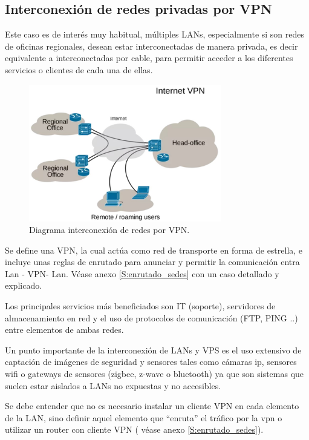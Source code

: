 \subsection{ Interconexión de redes privadas por VPN}
Este caso es de interés muy habitual, múltiples LANs, especialmente si son redes de oficinas regionales, desean estar interconectadas de manera privada, es decir equivalente a interconectadas por cable, para permitir acceder a los diferentes servicios o clientes de cada una de ellas.
\begin{figure}[!htb]
\begin{center}
\includegraphics[width=0.75\textwidth]{./figuras/vpn_network_link}
\caption{Diagrama interconexión de redes por VPN\cite{i_redes_sedes}.}
\label{F:vpn_network_link}
\end{center}
\end{figure}
Se define una VPN, la cual actúa como red de transporte en forma de estrella, e incluye unas reglas de enrutado para anunciar y permitir la comunicación entra Lan - VPN- Lan. Véase anexo \ref{S:enrutado_sedes} con un caso detallado y explicado.

Los principales servicios más beneficiados son IT (soporte), servidores de almacenamiento en red y el uso de protocolos de comunicación (FTP, PING ..) entre elementos de ambas redes.

Un punto importante de la interconexión de LANs y VPS es el uso extensivo de captación de imágenes de seguridad y sensores tales como cámaras ip, sensores wifi o gateways de sensores (zigbee, z-wave o bluetooth) ya que son sistemas que suelen estar aislados a LANs no expuestas y no accesibles.

Se debe entender que no es necesario instalar un cliente VPN en cada elemento de la LAN, sino definir aquel elemento que “enruta” el tráfico por la vpn o utilizar un router con cliente VPN ( véase anexo \ref{S:enrutado_sedes}).

